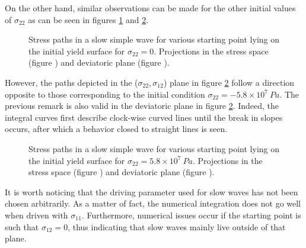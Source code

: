 On the other hand, similar observations can be made for the other initial values of $\sigma_{22}$ as can be seen in figures \ref{fig:slow_path_plane_stress2} and \ref{fig:slow_path_plane_stress3}.
\begin{figure}[h!]
  \centering
  \caption{Stress paths in a slow simple wave for various starting point lying on the initial yield surface for $\sigma_{22}=0$. Projections in the stress space (figure ) and deviatoric plane (figure ).}
  \label{fig:slow_path_plane_stress2}
\end{figure}
However, the paths depicted in the ($\sigma_{22},\sigma_{12}$) plane in figure \ref{fig:slow_path_plane_stress3} follow a direction opposite to those corresponding to the initial condition $\sigma_{22}=-5.8\times 10^7 \: Pa$.
The previous remark is also valid in the deviatoric plane in figure \ref{fig:slow_path_plane_stress3}.
Indeed, the integral curves first describe clock-wise curved lines until the break in slopes occurs, after which a behavior closed to straight lines is seen.
\begin{figure}[h!]
  \centering
  \caption{Stress paths in a slow simple wave for various starting point lying on the initial yield surface for $\sigma_{22}=5.8\times 10^7 \: Pa$. Projections in the stress space (figure ) and deviatoric plane (figure ).}
  \label{fig:slow_path_plane_stress3}
\end{figure}
It is worth noticing that the driving parameter used for slow waves has not been chosen arbitrarily.
As a matter of fact, the numerical integration does not go well when driven with $\sigma_{11}$.
Furthermore, numerical issues occur if the starting point is such that $\sigma_{12}=0$, thus indicating that slow waves mainly live outside of that plane.

